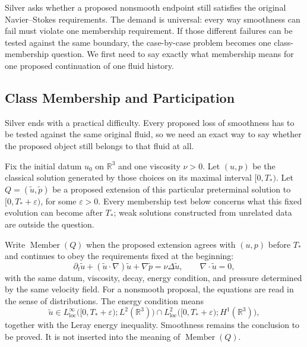 Silver asks whether a proposed nonsmooth endpoint still satisfies the original Navier--Stokes requirements.
The demand is universal: every way smoothness can fail must violate one membership requirement.
If those different failures can be tested against the same boundary, the case-by-case problem becomes one class-membership question.
We first need to say exactly what membership means for one proposed continuation of one fluid history.

\subsection{Class Membership and Participation}\label{sub:ClassMembershipAndParticipation}

Silver ends with a practical difficulty.
Every proposed loss of smoothness has to be tested against the same original fluid, so we need an exact way to say whether the proposed object still belongs to that fluid at all.

Fix the initial datum \(u_0\) on \(\mathbb R^3\) and one viscosity \(\nu>0\).
Let \((u,p)\) be the classical solution generated by those choices on its maximal interval \([0,T_*)\).
Let \(Q=(\widetilde u,\widetilde p)\) be a proposed extension of this particular preterminal solution to \([0,T_*+\varepsilon)\), for some \(\varepsilon>0\).
Every membership test below concerns what this fixed evolution can become after \(T_*\); weak solutions constructed from unrelated data are outside the question.

Write \(\operatorname{Member}(Q)\) when the proposed extension agrees with \((u,p)\) before \(T_*\) and continues to obey the requirements fixed at the beginning:
\[
  \partial_t\widetilde u
  +(\widetilde u\cdot\nabla)\widetilde u
  +\nabla\widetilde p
  =
  \nu\Delta\widetilde u,
  \qquad
  \nabla\cdot\widetilde u=0,
\]
with the same datum, viscosity, decay, energy condition, and pressure determined by the same velocity field.
For a nonsmooth proposal, the equations are read in the sense of distributions.
The energy condition means
\[
  \widetilde u
  \in
  L^\infty_{\mathrm{loc}}\bigl([0,T_*+\varepsilon);L^2(\mathbb R^3)\bigr)
  \cap
  L^2_{\mathrm{loc}}\bigl([0,T_*+\varepsilon);H^1(\mathbb R^3)\bigr),
\]
together with the Leray energy inequality.
Smoothness remains the conclusion to be proved.
It is not inserted into the meaning of \(\operatorname{Member}(Q)\).

